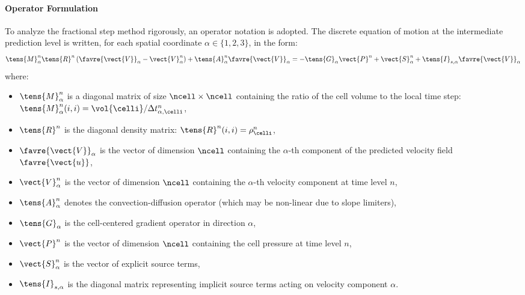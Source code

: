 \paragraph{Operator Formulation}
To analyze the fractional step method rigorously, an operator notation is
adopted. The discrete equation of motion at the intermediate prediction level
is written, for each spatial coordinate $\alpha \in \{1, 2, 3\}$, in the form:
\begin{equation}
  \tens{M}_\alpha^n \tens{R}^n \left( \favre{\vect{V}}_\alpha - \vect{V}_\alpha^n \right)
  + \tens{A}_\alpha^n \favre{\vect{V}}_\alpha
  = - \tens{G}_\alpha \vect{P}^n + \vect{S}_\alpha^n + \tens{I}_{s,\alpha} \favre{\vect{V}}_\alpha
  \label{eq:pressure_correction:discrete_qdm}
\end{equation}
where:
\begin{itemize}
\item $\tens{M}_\alpha^n$ is a diagonal matrix of size $\ncell \times \ncell$
  containing the ratio of the cell volume to the local time step:
  $\tens{M}_\alpha^n(i, i) = \vol{\celli} / \Delta t_{\alpha,\celli}^n$,
\item $\tens{R}^n$ is the diagonal density matrix: $\tens{R}^n(i, i) = \rho_\celli^n$,
\item $\favre{\vect{V}}_\alpha$ is the vector of dimension $\ncell$ containing the
  $\alpha$-th component of the predicted velocity field $\favre{\vect{u}}$,
\item $\vect{V}_\alpha^n$ is the vector of dimension $\ncell$ containing the
  $\alpha$-th velocity component at time level $n$,
\item $\tens{A}_\alpha^n$ denotes the convection-diffusion operator (which may be
  non-linear due to slope limiters),
\item $\tens{G}_\alpha$ is the cell-centered gradient operator in direction $\alpha$,
\item $\vect{P}^n$ is the vector of dimension $\ncell$ containing the cell pressure
  at time level $n$,
\item $\vect{S}_\alpha^n$ is the vector of explicit source terms,
\item $\tens{I}_{s,\alpha}$ is the diagonal matrix representing implicit source
  terms acting on velocity component $\alpha$.
\end{itemize}

